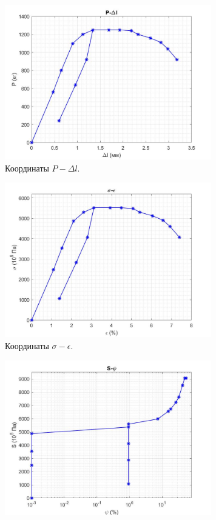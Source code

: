 \documentclass[12pt, a4paper]{article}
\begin{document}
    \begin{figure}[h]
        \centering
        \begin{subfigure}{.5\textwidth}
            \centering
            \includegraphics[width = 9cm]{fig_1.jpg}
            \caption{Координаты $P-\Delta l$.}
            \label{fig::fig1}
        \end{subfigure}%
        \begin{subfigure}{.5\textwidth}
            \centering
            \includegraphics[width = 9cm]{fig_2.jpg}
            \caption{Координаты $\sigma-\epsilon$.}
            \label{fig::fig2}
        \end{subfigure}
        \begin{subfigure}{.5\textwidth}
            \centering
            \includegraphics[width = 9cm]{fig_3.jpg}

\end{subfigure}
\end{figure}
\end{document}
